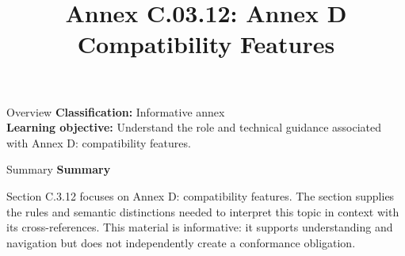\documentclass[10pt,letterpaper]{article}
\title{Annex C.03.12: Annex D Compatibility Features}
\author{}
\date{}
\begin{document}
\maketitle
\begin{CornellOverviewBox}{Overview}
\textbf{Classification:} Informative annex\\[2pt]
\textbf{Learning objective:} Understand the role and technical guidance associated with Annex D: compatibility features.
\end{CornellOverviewBox}\begin{CornellSummaryBox}{Summary}
{\sffamily\bfseries\color{Accent} Summary}\par\vspace{3pt}Section C.3.12 focuses on Annex D: compatibility features. The section supplies the rules and semantic distinctions needed to interpret this topic in context with its cross-references. This material is informative: it supports understanding and navigation but does not independently create a conformance obligation.
\end{CornellSummaryBox}
\end{document}
